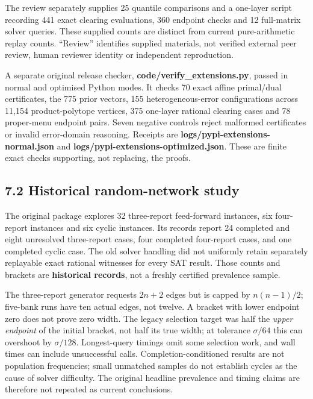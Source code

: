 \documentclass[
  british,
  11pt,
  a4paper,
]{article}
\begin{document}
The review separately supplies 25 quantile comparisons and a one-layer
script recording 441 exact clearing evaluations, 360 endpoint checks and
12 full-matrix solver queries. These supplied counts are distinct from
current pure-arithmetic replay counts. ``Review'' identifies supplied
materials, not verified external peer review, human reviewer identity or
independent reproduction.

A separate original release checker,
\textbf{code/verify\_extensions.py}, passed in normal and optimised
Python modes. It checks 70 exact affine primal/dual certificates, the
775 prior vectors, 155 heterogeneous-error configurations across 11,154
product-polytope vertices, 375 one-layer rational clearing cases and 78
proper-menu endpoint pairs. Seven negative controls reject malformed
certificates or invalid error-domain reasoning. Receipts are
\textbf{logs/pypi-extensions-normal.json} and
\textbf{logs/pypi-extensions-optimized.json}. These are finite exact
checks supporting, not replacing, the proofs.

\subsection{7.2 Historical random-network
study}\label{historical-random-network-study}

The original package explores 32 three-report feed-forward instances,
six four-report instances and six cyclic instances. Its records report
24 completed and eight unresolved three-report cases, four completed
four-report cases, and one completed cyclic case. The old solver
handling did not uniformly retain separately replayable exact rational
witnesses for every SAT result. Those counts and brackets are
\textbf{historical records}, not a freshly certified prevalence sample.

The three-report generator requests \(2n+2\) edges but is capped by
\(n(n-1)/2\); five-bank runs have ten actual edges, not twelve. A
bracket with lower endpoint zero does not prove zero width. The legacy
selection target was half the \emph{upper endpoint} of the initial
bracket, not half its true width; at tolerance \(\sigma/64\) this can
overshoot by \(\sigma/128\). Longest-query timings omit some selection
work, and wall times can include unsuccessful calls.
Completion-conditioned results are not population frequencies; small
unmatched samples do not establish cycles as the cause of solver
difficulty. The original headline prevalence and timing claims are
therefore not repeated as current conclusions.
\end{document}
